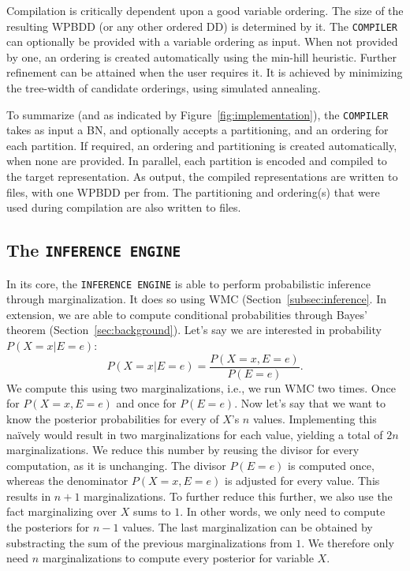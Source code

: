 Compilation is critically dependent upon a good variable ordering. The size of the resulting WPBDD (or any other ordered DD) is determined by it. The \texttt{COMPILER} can optionally be provided with a variable ordering as input. When not provided by one, an ordering is created automatically using the min-hill heuristic. Further refinement can be attained when the user requires it. It is achieved by minimizing the tree-width of candidate orderings, using simulated annealing.

To summarize (and as indicated by Figure~\ref{fig:implementation}), the \texttt{COMPILER} takes as input a BN, and optionally accepts a partitioning, and an ordering for each partition. If required, an ordering and partitioning is created automatically, when none are provided. In parallel, each partition is encoded and compiled to the target representation. As output, the compiled representations are written to files, with one WPBDD per from. The partitioning and ordering(s) that were used during compilation are also written to files.

\subsection{The \texttt{INFERENCE ENGINE}}

In its core, the \texttt{INFERENCE ENGINE} is able to perform probabilistic inference through marginalization. It does so using WMC (Section~\ref{subsec:inference}. In extension, we are able to compute conditional probabilities through Bayes' theorem (Section~\ref{sec:background}). Let's say we are interested in probability $P(X = x | E = e)$:  \[P(X = x | E = e) = \frac{P(X = x, E = e)}{P(E = e)}.\]
We compute this using two marginalizations, i.e., we run WMC two times. Once for $P(X = x, E = e)$ and once for $P(E = e)$. Now let's say that we want to know the posterior probabilities for every of $X$'s $n$ values. Implementing this na\"ively would result in two marginalizations for each value, yielding a total of $2n$ marginalizations. We reduce this number by reusing the divisor for every computation, as it is unchanging. The divisor $P(E = e)$ is computed once, whereas the denominator $P(X = x, E = e)$ is adjusted for every value. This results in $n + 1$ marginalizations. To further reduce this further, we also use the fact marginalizing over $X$ sums to $1$. In other words, we only need to compute the posteriors for $n-1$ values. The last marginalization can be obtained by substracting the sum of the previous marginalizations from $1$. We therefore only need $n$ marginalizations to compute every posterior for variable $X$.

